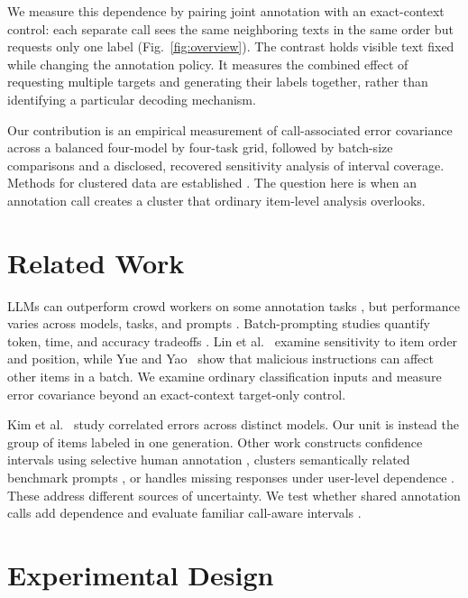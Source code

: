 \documentclass[conference]{IEEEtran}
\begin{document}
We measure this dependence by pairing joint annotation with an exact-context control: each separate call sees the same neighboring texts in the same order but requests only one label (Fig.~\ref{fig:overview}). The contrast holds visible text fixed while changing the annotation policy. It measures the combined effect of requesting multiple targets and generating their labels together, rather than identifying a particular decoding mechanism.

Our contribution is an empirical measurement of call-associated error covariance across a balanced four-model by four-task grid, followed by batch-size comparisons and a disclosed, recovered sensitivity analysis of interval coverage. Methods for clustered data are established \cite{liang1986longitudinal,cameron2015cluster}. The question here is when an annotation call creates a cluster that ordinary item-level analysis overlooks.

\section{Related Work}
LLMs can outperform crowd workers on some annotation tasks \cite{gilardi2023chatgpt}, but performance varies across models, tasks, and prompts \cite{tan2024survey,ziems2024css,pangakis2025humans,sclar2024prompt}. Batch-prompting studies quantify token, time, and accuracy tradeoffs \cite{cheng2023batch,pipal2026waste}. Lin et al.~\cite{lin2024batchprompt} examine sensitivity to item order and position, while Yue and Yao~\cite{yue2025vulnerable} show that malicious instructions can affect other items in a batch. We examine ordinary classification inputs and measure error covariance beyond an exact-context target-only control.

Kim et al.~\cite{kim2025correlated} study correlated errors across distinct models. Our unit is instead the group of items labeled in one generation. Other work constructs confidence intervals using selective human annotation \cite{gligoric2025unconfident}, clusters semantically related benchmark prompts \cite{llewellyn2025prompt}, or handles missing responses under user-level dependence \cite{zeng2025missing}. These address different sources of uncertainty. We test whether shared annotation calls add dependence and evaluate familiar call-aware intervals \cite{cameron2015cluster,mackinnon2023cluster,field2007bootstrap}.

\section{Experimental Design}
\end{document}
